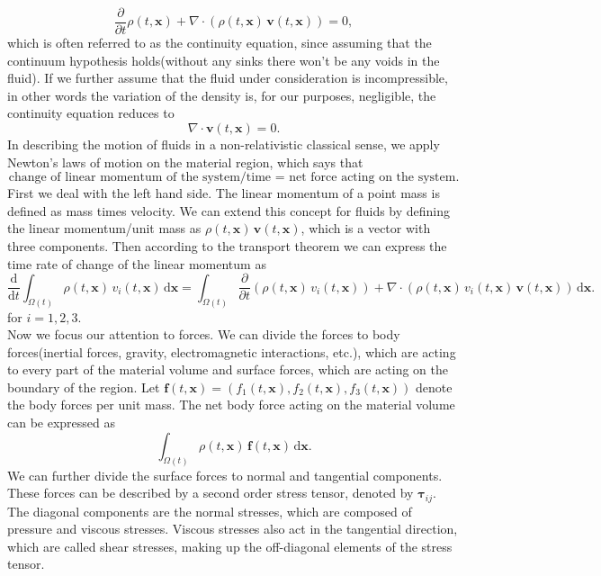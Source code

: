 \documentclass[../include.tex]{subfiles}
\begin{document}
\[
\frac{\partial}{\partial t} \rho (t, \mathbf{x}) + \nabla \cdot (\rho(t, \mathbf{x})\,\mathbf{v}(t, \mathbf{x})) = 0,
\]
which is often referred to as the continuity equation, since assuming that the continuum hypothesis holds(without any sinks there won't be any voids in the fluid). If we further assume that the fluid under consideration is incompressible, in other words the variation of the density is, for our purposes, negligible, the continuity equation reduces to
\begin{equation}
	\label{continuity}
	\nabla \cdot \mathbf{v}(t, \mathbf{x}) = 0.
\end{equation}
In describing the motion of fluids in a non-relativistic classical sense, we apply Newton's laws of motion on the material region, which says that
\[
\text{change of linear momentum of the system/time = net force acting on the system}.
\]
First we deal with the left hand side. The linear momentum of a point mass is defined as mass times velocity. We can extend this concept for fluids by defining the linear momentum/unit mass as $ \rho(t, \mathbf{x})\,\mathbf{v}(t, \mathbf{x}) $, which is a vector with three components. Then according to the transport theorem we can express the time rate of change of the linear momentum as
\[
\frac{\mathrm{d}}{\mathrm{d}t}  \int_{\Omega(t)} \rho(t, \mathbf{x})\,v_i (t, \mathbf{x}) \,\mathrm{d}\mathbf{x} = 
\int_{\Omega(t)} \frac{\partial}{\partial t}  (\rho(t, \mathbf{x})\,v_i (t, \mathbf{x})) + \nabla \cdot (\rho(t, \mathbf{x})\,v_i(t, \mathbf{x})\,\mathbf{v}(t, \mathbf{x}))\,\mathrm{d}\mathbf{x}.
\]
\quad for $ i = 1, 2, 3 $. \\
Now we focus our attention to forces. We can divide the forces to body forces(inertial forces, gravity, electromagnetic interactions, etc.), which are acting to every part of the material volume and surface forces, which are acting on the boundary of the region.
Let $ \mathbf{f} (t, \mathbf{x})  = (f_1(t, \mathbf{x}), f_2(t, \mathbf{x}), f_3(t, \mathbf{x})) $ denote the body forces per unit mass. The net body force acting on the material volume can be expressed as
\[
\int_{\Omega(t)} \rho (t, \mathbf{x})\, \mathbf{f} (t, \mathbf{x})\,\mathrm{d}\mathbf{x}.
\]
We can further divide the surface forces to normal and tangential components. These forces can be described by a second order stress tensor, denoted by $ \mathbf{\tau}_{ij} $. The diagonal components are the normal stresses, which are composed of pressure and viscous stresses. Viscous stresses also act in the tangential direction, which are called shear stresses, making up the off-diagonal elements of the stress tensor.
\end{document}
